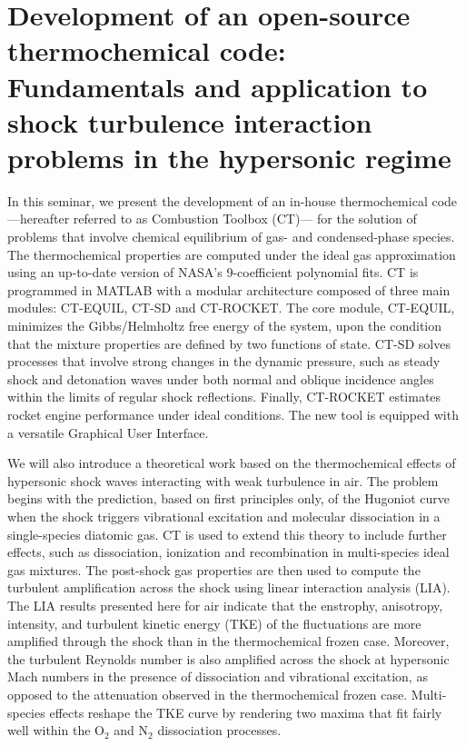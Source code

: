 \documentclass[a4paper,12pt,landscape]{article}
\begin{document}
\pagestyle{empty}
\begin{minipage}[c]{0.5\textwidth}
    \vspace{0.55cm}
    \section*{Development of an open-source thermochemical code: Fundamentals and application to shock turbulence interaction problems in the hypersonic regime}
    In this seminar, we present the development of an in-house thermochemical code ---hereafter referred to as Combustion Toolbox (CT)--- for the solution of problems that involve chemical equilibrium of gas- and condensed-phase species. The thermochemical properties are computed under the ideal gas approximation using an up-to-date version of NASA’s 9-coefficient polynomial fits. CT is programmed in MATLAB with a modular architecture composed of three main modules: CT-EQUIL, CT-SD and CT-ROCKET. The core module, CT-EQUIL, minimizes the Gibbs/Helmholtz free energy of the system, upon the condition that the mixture properties are defined by two functions of state. CT-SD solves processes that involve strong changes in the dynamic pressure, such as steady shock and detonation waves under both normal and oblique incidence angles within the limits of regular shock reflections. Finally, CT-ROCKET estimates rocket engine performance under ideal conditions. The new tool is equipped with a versatile Graphical User Interface.\vspace{0.23cm}

    We will also introduce a theoretical work based on the thermochemical effects of hypersonic shock waves interacting with weak turbulence in air. The problem begins with the prediction, based on first principles only, of the Hugoniot curve when the shock triggers vibrational excitation and molecular dissociation in a single-species diatomic gas. CT is used to extend this theory to include further effects, such as dissociation, ionization and recombination in multi-species ideal gas mixtures. The post-shock gas properties are then used to compute the turbulent amplification across the shock using linear interaction analysis (LIA). The LIA results presented here for air indicate that the enstrophy, anisotropy, intensity, and turbulent kinetic energy (TKE) of the fluctuations are more amplified through the shock than in the thermochemical frozen case. Moreover, the turbulent Reynolds number is also amplified across the shock at hypersonic Mach numbers in the presence of dissociation and vibrational excitation, as opposed to the attenuation observed in the thermochemical frozen case. Multi-species effects reshape the TKE curve by rendering two maxima that fit fairly well within the O$_2$ and N$_2$ dissociation processes.
    
\end{minipage}
\end{document}
